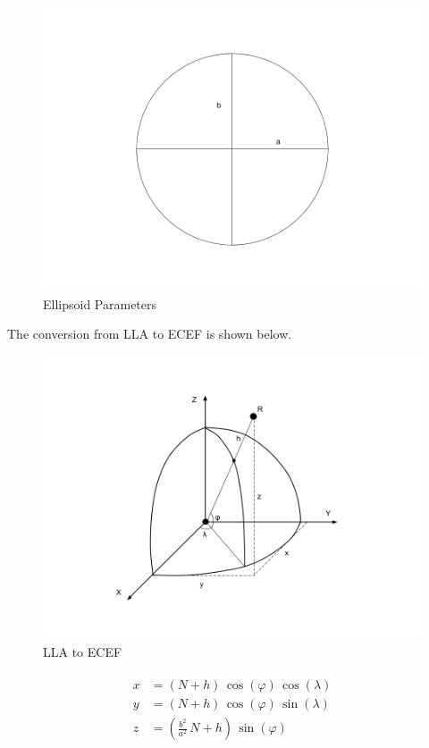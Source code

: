 \begin{figure}[H]
\centering
\includegraphics[width=\linewidth]{Figures/ellipsoid-parameters.png}
\decoRule
\caption[ellipsoid-parameters]{Ellipsoid Parameters}
\end{figure}

The conversion from LLA to ECEF is shown below.

\begin{figure}[H]
\centering
\includegraphics[width=\linewidth]{Figures/lla2ecef.png}
\decoRule
\caption[lla2ecef]{LLA to ECEF}
\end{figure}

\[
\begin{array}{lr}
\begin{aligned}
x &= (N + h)\,\cos(\varphi)\,\cos(\lambda)\\
y &= (N + h)\,\cos(\varphi)\,\sin(\lambda)\\
z &= (\frac{b^2}{a^2}\,N + h)\,\sin(\varphi)\\
\end{aligned}
\end{array}
\]

